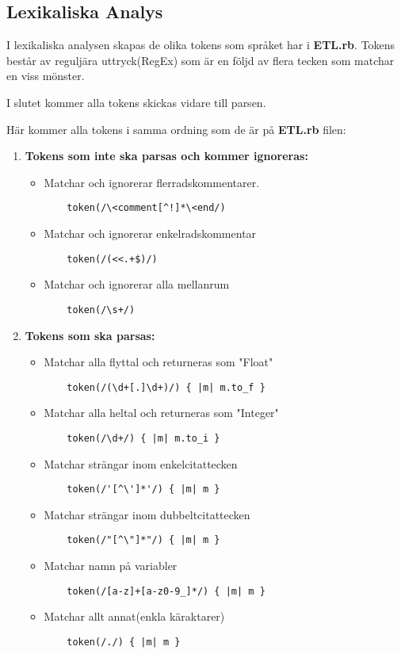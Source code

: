 \documentclass{TDP019mall}
\begin{document}
\subsection{Lexikaliska Analys}
I lexikaliska analysen skapas de olika tokens som språket har i \textbf{ETL.rb}. Tokens består av reguljära uttryck(RegEx) som är en följd av 
flera tecken som matchar en viss mönster. 

I slutet kommer alla tokens skickas vidare till parsen. 

Här kommer alla tokens i samma ordning som de är på \textbf{ETL.rb} filen:

\begin{enumerate}

\item \textbf{Tokens som inte ska parsas och kommer ignoreras:}
\begin{itemize}

\item Matchar och ignorerar flerradskommentarer.
\begin{verbatim}
    token(/\<comment[^!]*\<end/)
\end{verbatim}
\item Matchar och ignorerar enkelradskommentar
\begin{verbatim}
    token(/(<<.+$)/)
\end{verbatim}
\item Matchar och ignorerar alla mellanrum
\begin{verbatim}
    token(/\s+/)
\end{verbatim}
\end{itemize}

\item \textbf{Tokens som ska parsas:}
\begin{itemize}
\item Matchar alla flyttal och returneras som "Float"
\begin{verbatim}
    token(/(\d+[.]\d+)/) { |m| m.to_f }
\end{verbatim}
\item Matchar alla heltal och returneras som "Integer"
\begin{verbatim}
    token(/\d+/) { |m| m.to_i }
\end{verbatim}
\item Matchar strängar inom enkelcitattecken
\begin{verbatim}
    token(/'[^\']*'/) { |m| m } 
\end{verbatim}
\item Matchar strängar inom dubbeltcitattecken
\begin{verbatim}
    token(/"[^\"]*"/) { |m| m }
\end{verbatim}
\item Matchar namn på variabler
\begin{verbatim}
    token(/[a-z]+[a-z0-9_]*/) { |m| m }
\end{verbatim}
\item Matchar allt annat(enkla käraktarer)
\begin{verbatim}
    token(/./) { |m| m } 
\end{verbatim}
\end{itemize}
\end{enumerate}
\end{document}
